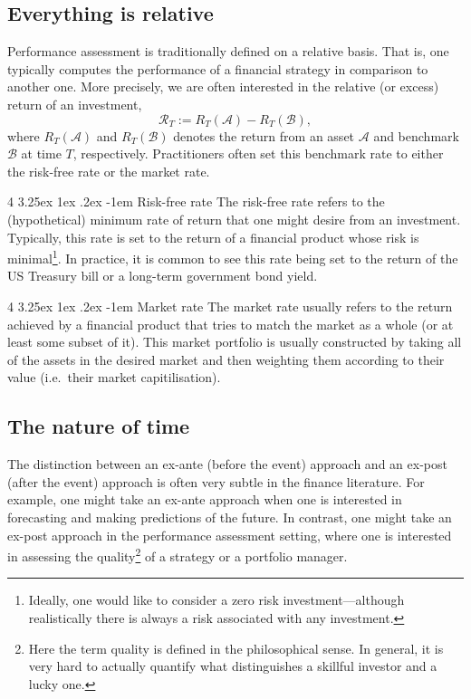 \documentclass[12pt]{article}
\makeatletter
\renewcommand\paragraph{%
	\@startsection{paragraph}
	{4}
	{\z@}
	{3.25ex \@plus1ex \@minus.2ex}
	{-1em}
	{\normalfont\normalsize\bfseries\maybe@addperiod}%
}
\newcommand{\maybe@addperiod}[1]{%
	#1\@addpunct{.}%
}
\makeatother
\begin{document}
\subsection{Everything is relative}
Performance assessment is traditionally defined on a relative basis. That is, one typically computes the performance of a financial strategy in comparison to another one. More precisely, we are often interested in the relative (or excess) return of an investment,
\begin{equation}
    \mathcal{R}_T := R_T(\mathcal{A}) - R_T(\mathcal{B}),
    \label{eqn:relative_return}
\end{equation}
where $R_T(\mathcal{A})$ and $R_T(\mathcal{B})$ denotes the return from an asset $\mathcal{A}$ and benchmark $\mathcal{B}$ at time $T$, respectively. Practitioners often set this benchmark rate to either the risk-free rate or the market rate.

\paragraph{Risk-free rate} The risk-free rate refers to the (hypothetical) minimum rate of return that one might desire from an investment. Typically, this rate is set to the return of a financial product whose risk is minimal\footnote{Ideally, one would like to consider a zero risk investment---although realistically there is always a risk associated with any investment.}. In practice, it is common to see this rate being set to the return of the US Treasury bill or a long-term government bond yield.

\paragraph{Market rate} The market rate usually refers to the return achieved by a financial product that tries to match the market as a whole (or at least some subset of it). This market portfolio is usually constructed by taking all of the assets in the desired market and then weighting them according to their value (i.e.\ their market capitilisation).
\subsection{The nature of time}
The distinction between an ex-ante (before the event) approach and an ex-post (after the event) approach is often very subtle in the finance literature. For example, one might take an ex-ante approach when one is interested in forecasting and making predictions of the future. In contrast, one might take an ex-post approach in the performance assessment setting, where one is interested in assessing the quality\footnote{Here the term quality is defined in the philosophical sense. In general, it is very hard to actually quantify what distinguishes a skillful investor and a lucky one.} of a strategy or a portfolio manager.
\end{document}
